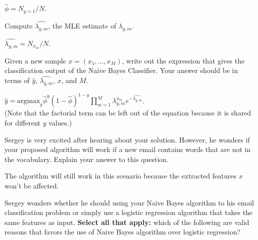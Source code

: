 \begin{parts}
\begin{subparts}
        \begin{tcolorbox}[fit,height=2cm, width=15cm, blank, borderline={1pt}{-2pt}]
        \end{tcolorbox}
        \begin{soln}
            $\hat{\phi} = N_{y=1} / N.$
        \end{soln}
    \subpart[2] Compute $\hat{\lambda_{y,m}}$, the MLE estimate of $\lambda_{y,m}$.
        \begin{tcolorbox}[fit,height=2cm, width=15cm, blank, borderline={1pt}{-2pt}]
        \end{tcolorbox}
        \begin{soln}
            $\hat{\lambda_{y,m}} = N_{x_m} / N.$
        \end{soln}
    \subpart[2] Given a new sample $x = (x_1, \ldots, x_M)$, write out the expression that gives the classification output of the Naive Bayes Classifier. Your answer should be in terms of $\hat{y}$, $\hat{\lambda_{y,m}}$, $x$, and $M$.
        \begin{tcolorbox}[fit,height=2cm, width=15cm, blank, borderline={1pt}{-2pt}]
        \end{tcolorbox}
        \begin{soln}
            $\hat{y} = \text{argmax}_{y} \hat{\phi}^y (1-\hat{\phi})^{1-y} \prod_{m=1}^M \lambda_{y,m}^{x_m} e^{-\hat{\lambda_{y,m}}}$. \\
            (Note that the factorial term can be left out of the equation because it is shared for different $y$ values.)
        \end{soln}
    \subpart[1] Sergey is very excited after hearing about your solution. However, he wonders if your proposed algorithm will work if a new email contains words that are not in the vocabulary. Explain your answer to this question.
        \begin{tcolorbox}[fit,height=2cm, width=15cm, blank, borderline={1pt}{-2pt}]
        \end{tcolorbox}
        \begin{soln}
            The algorithm will still work in this scenario because the extracted features $x$ won't be affected.
        \end{soln}
    \subpart[2] Sergey wonders whether he should using your Naive Bayes algorithm to his email classification problem or simply use a logistic regression algorithm that takes the same features as input. \textbf{Select all that apply:} which of the following are valid reasons that favors the use of Naive Bayes algorithm over logistic regression?

\end{subparts}
\end{parts}
